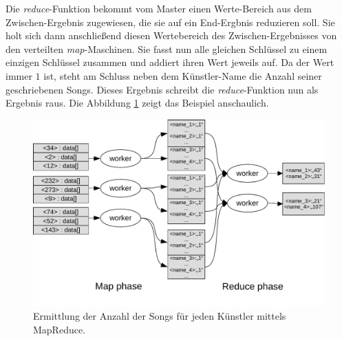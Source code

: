 Die \textit{reduce}-Funktion bekommt vom Master einen Werte-Bereich aus dem Zwischen-Ergebnis zugewiesen, die sie auf
ein End-Ergbnis reduzieren soll. Sie holt sich dann anschließend diesen Wertebereich des Zwischen-Ergebnisses von den verteilten
\textit{map}-Maschinen. Sie fasst nun alle gleichen Schlüssel zu einem einzigen Schlüssel zusammen und addiert 
ihren Wert jeweils auf. Da der Wert immer $1$ ist, steht am Schluss neben dem Künstler-Name die Anzahl seiner geschriebenen
Songs. Dieses Ergebnis schreibt die  \textit{reduce}-Funktion nun als Ergebnis raus. Die Abbildung \ref{fig:mapreduceExample} zeigt 
das Beispiel anschaulich.

\begin{figure}
\centering
\includegraphics[width=1.0\textwidth]{images/mapreduceExample.pdf}
\caption{Ermittlung der Anzahl der Songs für jeden Künstler mittels MapReduce.}
\label{fig:mapreduceExample}
\end{figure}

%

